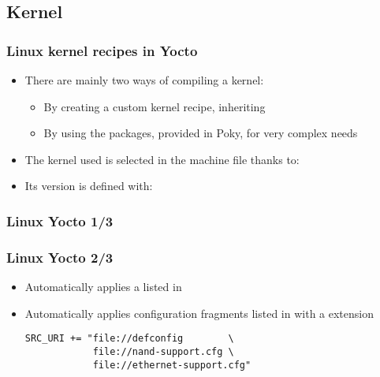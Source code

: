 \subsection{Kernel}

\begin{frame}
  \frametitle{Linux kernel recipes in Yocto}
  \begin{itemize}
    \item There are mainly two ways of compiling a kernel:
      \begin{itemize}
        \item By creating a custom kernel recipe, inheriting
        \item By using the  packages, provided in
          Poky, for very complex needs
      \end{itemize}
    \item The kernel used is selected in the machine file thanks to:
    \item Its version is defined with:
  \end{itemize}
\end{frame}

\begin{frame}[fragile]
  \frametitle{Linux Yocto 1/3}
\end{frame}

\begin{frame}[fragile]
  \frametitle{Linux Yocto 2/3}
  \begin{itemize}
    \item Automatically applies a  listed in 
    \item Automatically applies configuration fragments listed in  with a  extension
      \begin{block}{}
        \begin{verbatim}
SRC_URI += "file://defconfig        \
            file://nand-support.cfg \
            file://ethernet-support.cfg"
        \end{verbatim}
      \end{block}
  \end{itemize}
\end{frame}

